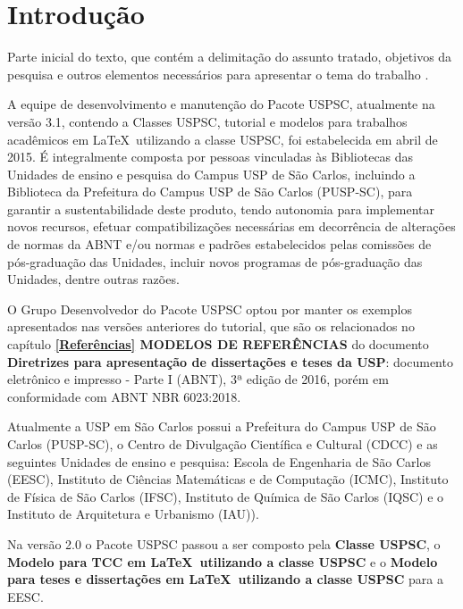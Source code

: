 
\chapter[Introdução]{Introdução}
\label{Introdução}

Parte inicial do texto, que contém a delimitação do assunto tratado, objetivos da pesquisa e outros elementos necessários para apresentar o tema do trabalho \cite{aguia2020}.

A equipe de desenvolvimento e manutenção do Pacote USPSC, atualmente na versão 3.1, contendo a Classes USPSC, tutorial e modelos para trabalhos acadêmicos em \LaTeX\ utilizando a classe USPSC, foi estabelecida em abril de 2015. É integralmente composta por pessoas vinculadas às Bibliotecas das Unidades de ensino e pesquisa do Campus USP de São Carlos, incluindo a Biblioteca da Prefeitura do Campus USP de São Carlos (PUSP-SC), para garantir a sustentabilidade deste produto, tendo autonomia para implementar novos recursos, efetuar compatibilizações necessárias em decorrência de alterações de normas da ABNT e/ou normas e padrões estabelecidos pelas comissões de pós-graduação das Unidades, incluir novos programas de pós-graduação das Unidades, dentre outras razões.

O Grupo Desenvolvedor do Pacote USPSC optou por manter os exemplos apresentados nas versões anteriores do tutorial, que são os relacionados no capítulo \textbf{\ref{Referências} MODELOS DE REFERÊNCIAS} do documento \textbf{Diretrizes para apresentação de dissertações e teses da USP}: documento eletrônico e impresso - Parte I (ABNT), 3ª edição de 2016, porém em conformidade com ABNT NBR 6023:2018. 

Atualmente a USP em São Carlos possui a Prefeitura do Campus USP de São Carlos (PUSP-SC), o Centro de Divulgação Científica e Cultural (CDCC) e as seguintes Unidades de ensino e pesquisa: Escola de Engenharia de São Carlos (EESC), Instituto de Ciências Matemáticas e de Computação (ICMC), Instituto de Física de São Carlos (IFSC), Instituto de Química de São Carlos (IQSC) e o Instituto de Arquitetura e Urbanismo (IAU)).

Na versão 2.0 o Pacote USPSC passou a ser composto pela \textbf{Classe USPSC}, o \textbf{Modelo para TCC em \LaTeX\ utilizando a classe USPSC} e o \textbf{Modelo para teses e dissertações em \LaTeX\ utilizando a classe USPSC} para a EESC.

